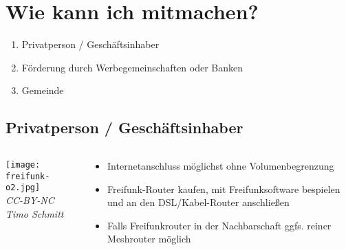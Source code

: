 \documentclass{beamer}
\begin{document}
\section{Wie kann ich mitmachen?}
\begin{frame}
	\begin{enumerate}
		\item Privatperson / Geschäftsinhaber
		\item Förderung durch Werbegemeinschaften oder Banken
		\item Gemeinde
	\end{enumerate}
\end{frame}
\subsection{Privatperson / Geschäftsinhaber}
\begin{frame}
	\begin{columns}
		\begin{column}{0.4\textwidth}
			\begin{center}
			\texttt{[image: freifunk-o2.jpg]}\\
			\textit{\tiny CC-BY-NC Timo Schmitt}
		\end{center}
		\end{column}
		\begin{column}{0.5\textwidth}
			\begin{itemize}
				\item Internetanschluss möglichst ohne Volumenbegrenzung
				\item Freifunk-Router kaufen, mit Freifunksoftware bespielen und an den DSL/Kabel-Router anschließen
				\item Falls Freifunkrouter in der Nachbarschaft ggfs. reiner Meshrouter möglich
			\end{itemize}
		\end{column}
	\end{columns}
\end{frame}
\end{document}
